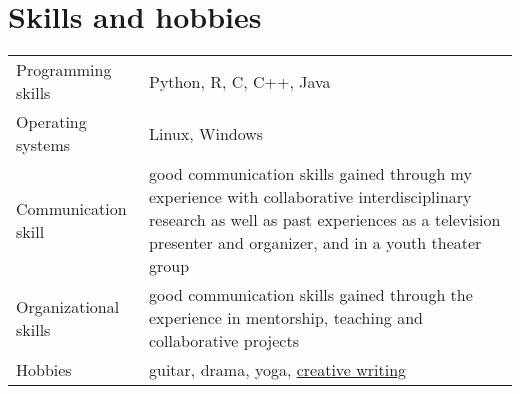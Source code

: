 \documentclass[a4paper,12pt]{article}
\begin{document}
\section{Skills and hobbies}
\begin{tabularx}{\linewidth}{@{}l X@{}}
Programming skills &  \normalsize{Python, R, C, C++, Java}\\
Operating systems &  \normalsize{Linux, Windows}\\
Communication skill & \normalsize{good communication skills gained through my experience with collaborative interdisciplinary research as well as past experiences as a television presenter and organizer, and in a youth theater group} \\
Organizational skills  &  \normalsize{good communication skills gained through the experience in mentorship, teaching and collaborative projects}\\  
Hobbies &  \normalsize{guitar, drama, yoga, \href{http://blablablatruc.blogspot.com/}{creative writing}}\\
\end{tabularx}

\vfill
{}
\end{document}
